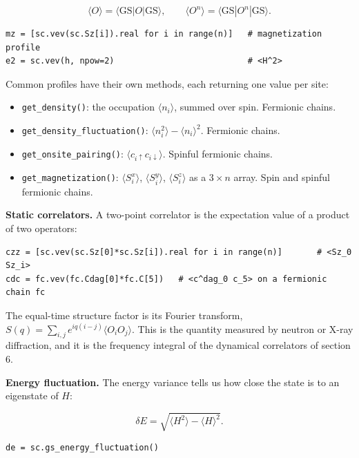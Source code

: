 \documentclass[11pt]{article}
\providecommand{\tightlist}{\setlength{\itemsep}{0pt}\setlength{\parskip}{0pt}}
\begin{document}
\[\langle O\rangle=\langle\mathrm{GS}|O|\mathrm{GS}\rangle,\qquad
\langle O^n\rangle=\langle\mathrm{GS}|O^n|\mathrm{GS}\rangle.\]

\begin{lstlisting}
mz = [sc.vev(sc.Sz[i]).real for i in range(n)]   # magnetization profile
e2 = sc.vev(h, npow=2)                           # <H^2>
\end{lstlisting}

Common profiles have their own methods, each returning one value per site:

\begin{itemize}
\tightlist
\item
  \texttt{get\_\allowbreak{}density()}: the occupation \(\langle n_i\rangle\), summed over spin.
  Fermionic chains.
\item
  \texttt{get\_\allowbreak{}density\_\allowbreak{}fluctuation()}: \(\langle n_i^2\rangle-\langle n_i\rangle^2\).
  Fermionic chains.
\item
  \texttt{get\_\allowbreak{}onsite\_\allowbreak{}pairing()}: \(\langle c_{i\uparrow}c_{i\downarrow}\rangle\).
  Spinful fermionic chains.
\item
  \texttt{get\_\allowbreak{}magnetization()}: \(\langle S^x_i\rangle\), \(\langle S^y_i\rangle\),
  \(\langle S^z_i\rangle\) as a \(3\times n\) array. Spin and spinful fermionic
  chains.
\end{itemize}

\textbf{Static correlators.} A two-point correlator is the expectation value of
a product of two operators:

\begin{lstlisting}
czz = [sc.vev(sc.Sz[0]*sc.Sz[i]).real for i in range(n)]       # <Sz_0 Sz_i>
cdc = fc.vev(fc.Cdag[0]*fc.C[5])   # <c^dag_0 c_5> on a fermionic chain fc
\end{lstlisting}

The equal-time structure factor is its Fourier transform,
\(S(q)=\sum_{i,j}e^{iq(i-j)}\langle O_iO_j\rangle\). This is the
quantity measured by neutron or X-ray diffraction, and it is the
frequency integral of the dynamical correlators of section 6.

\textbf{Energy fluctuation.} The energy variance tells us how close the state is
to an eigenstate of \(H\):

\[\delta E=\sqrt{\langle H^2\rangle-\langle H\rangle^2}.\]

\begin{lstlisting}
de = sc.gs_energy_fluctuation()
\end{lstlisting}
\end{document}
